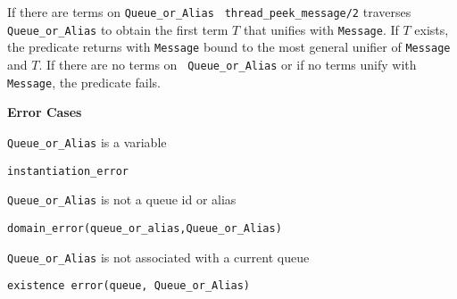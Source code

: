 \begin{description}
%
If there are terms on {\tt Queue\_or\_Alias} {\tt
  thread\_peek\_message/2} traverses {\tt Queue\_or\_Alias} to obtain
the first term $T$ that unifies with {\tt Message}.  If $T$ exists,
the predicate returns with {\tt Message} bound to the most general
unifier of {\tt Message} and $T$.  If there are no terms on {\tt
  Queue\_or\_Alias} or if no terms unify with {\tt Message}, the predicate fails.

{\bf Error Cases}
\bi
\item 	{\tt Queue\_or\_Alias} is a variable
\bi
\item 	{\tt instantiation\_error}
\ei
%
\item 	{\tt Queue\_or\_Alias} is not a queue id or alias
\bi
\item 	{\tt domain\_error(queue\_or\_alias,Queue\_or\_Alias)}
\ei
\item {\tt Queue\_or\_Alias} is not associated with a current queue
\bi
\item   {\tt existence error(queue, Queue\_or\_Alias)}
\ei
\ei
%


\end{description}
